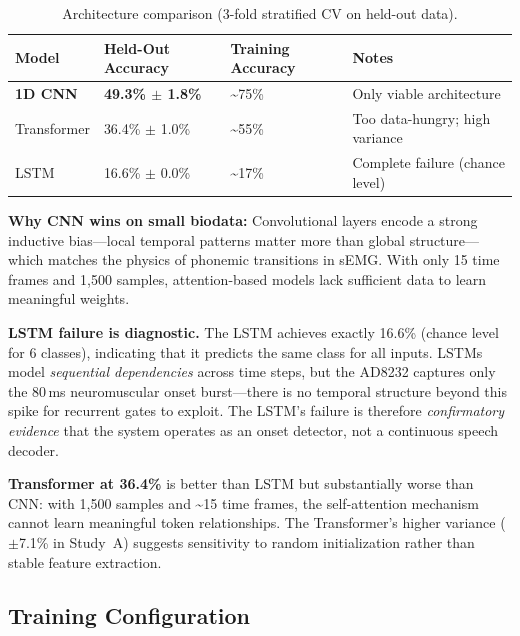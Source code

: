 \documentclass[11pt, a4paper]{article}
\begin{document}
\begin{table}[h]
\centering
\caption{Architecture comparison (3-fold stratified CV on held-out data).}
\label{tab:arch_comparison}
\begin{tabular}{@{}llll@{}}
\toprule
Model & Held-Out Accuracy & Training Accuracy & Notes \\
\midrule
\textbf{1D CNN} & \textbf{49.3\% $\pm$ 1.8\%} & \textasciitilde75\% & Only viable architecture \\
Transformer & 36.4\% $\pm$ 1.0\% & \textasciitilde55\% & Too data-hungry; high variance \\
LSTM & 16.6\% $\pm$ 0.0\% & \textasciitilde17\% & Complete failure (chance level) \\
\bottomrule
\end{tabular}
\end{table}

\textbf{Why CNN wins on small biodata:} Convolutional layers encode a strong inductive bias---local temporal patterns matter more than global structure---which matches the physics of phonemic transitions in sEMG. With only 15 time frames and 1{,}500 samples, attention-based models lack sufficient data to learn meaningful weights.

\textbf{LSTM failure is diagnostic.} The LSTM achieves exactly 16.6\% (chance level for 6 classes), indicating that it predicts the same class for all inputs. LSTMs model \emph{sequential dependencies} across time steps, but the AD8232 captures only the 80\,ms neuromuscular onset burst---there is no temporal structure beyond this spike for recurrent gates to exploit. The LSTM's failure is therefore \emph{confirmatory evidence} that the system operates as an onset detector, not a continuous speech decoder.

\textbf{Transformer at 36.4\%} is better than LSTM but substantially worse than CNN: with 1,500 samples and \textasciitilde15 time frames, the self-attention mechanism cannot learn meaningful token relationships. The Transformer's higher variance ($\pm$7.1\% in Study~A) suggests sensitivity to random initialization rather than stable feature extraction.

\subsection{Training Configuration}
\end{document}
